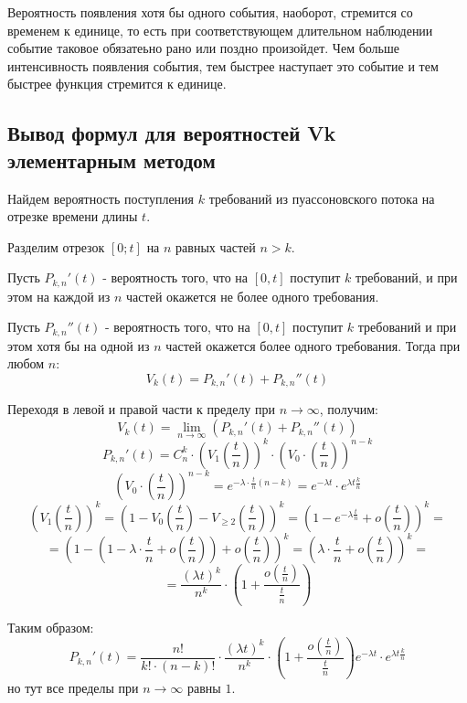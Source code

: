 \documentclass[aps,%
12pt,%
final,%
oneside,
onecolumn,%
musixtex, %
superscriptaddress,%
centertags]{article} %
\theoremstyle{plain}
\theoremstyle{definition}
\theoremstyle{remark}
\begin{document}
Вероятность появления хотя бы одного события, наоборот, стремится со временем к единице, то есть при соответствующем длительном наблюдении событие таковое обязатеьно рано или поздно произойдет. Чем больше интенсивность появления события, тем быстрее наступает это событие и тем быстрее функция стремится к единице.


\newpage
\subsection{Вывод формул для вероятностей Vk элементарным методом}

Найдем вероятность поступления $k$ требований из пуассоновского потока на отрезке времени длины $t$.

Разделим отрезок $[0;t]$ на $n$ равных частей $n > k$.

Пусть $P_{k,n}'(t)$ - вероятность того, что на $[0,t]$ поступит $k$ требований, и при этом на каждой из $n$ частей окажется не более одного требования.

Пусть $P_{k,n}''(t)$ - вероятность того, что на $[0,t]$ поступит $k$ требований и при этом хотя бы на одной из $n$ частей окажется более одного требования. Тогда при любом $n$:
$$V_k(t) = P_{k,n}'(t) + P_{k,n}''(t)$$

Переходя в левой и правой части к пределу при $n \to \infty$, получим:
$$V_k(t) = \lim\limits_{n \to \infty} \left ( P_{k,n}'(t) + P_{k,n}''(t)\right)$$
$$P_{k,n}'(t) = C_n^k \cdot \left(V_1\left(\frac{t}{n}\right)\right)^k \cdot \left(V_0 \cdot \left(\frac{t}{n}\right)\right)^{n-k}$$
$$\left(V_0 \cdot \left(\frac{t}{n}\right)\right)^{n-k} = e^{-\lambda \cdot \frac{t}{n}(n-k)} = e^{-\lambda t} \cdot e^{\lambda t \frac{k}{n}}$$
$$\left(V_1\left(\frac{t}{n}\right)\right)^k = \left(1 - V_0\left(\frac{t}{n}\right) - V_{\geq 2} \left(\frac{t}{n}\right)\right)^k = \left(1 - e^{-\lambda \frac{t}{n}} + o\left(\frac{t}{n}\right)\right)^k=$$
$$=\left(1 - \left(1 - \lambda \cdot \frac{t}{n} + o\left(\frac{t}{n}\right)\right) + o\left(\frac{t}{n}\right)\right)^k = \left(\lambda \cdot \frac{t}{n} + o\left(\frac{t}{n}\right)\right)^k = $$
$$ = \frac{(\lambda t)^k}{n^k} \cdot \left(1 + \frac{o\left(\frac{t}{n}\right)}{\frac{t}{n}}\right)$$

Таким образом:
$$P_{k,n}'(t) = \frac{n!}{k! \cdot (n-k)!} \cdot  \frac{(\lambda t)^k}{n^k} \cdot \left(1 + \frac{o\left(\frac{t}{n}\right)}{\frac{t}{n}}\right) e^{-\lambda t} \cdot e^{\lambda t \frac{k}{n}}$$
но тут все пределы при $n \to \infty$ равны $1$.
\end{document}
